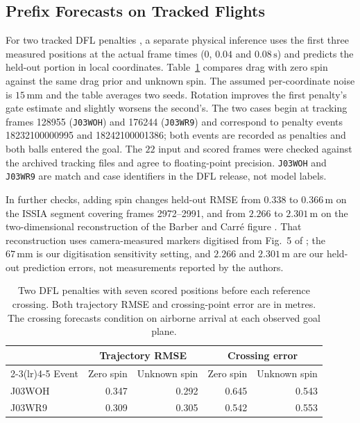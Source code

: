 \documentclass[11pt,a4paper]{article}
\begin{document}
\subsection{Prefix Forecasts on Tracked Flights}
\label{sec:dfl}

For two tracked DFL penalties \cite{dfl2025}, a separate physical inference uses the first three measured positions at the actual frame times ($0$, $0.04$ and $0.08\,\mathrm{s}$) and predicts the held-out portion in local coordinates. Table~\ref{tab:dfl} compares drag with zero spin against the same drag prior and unknown spin. The assumed per-coordinate noise is $15\,\mathrm{mm}$ and the table averages two seeds. Rotation improves the first penalty's gate estimate and slightly worsens the second's. The two cases begin at tracking frames 128955 (\texttt{J03WOH}) and 176244 (\texttt{J03WR9}) and correspond to penalty events 18232100000995 and 18242100001386; both events are recorded as penalties and both balls entered the goal. The $22$ input and scored frames were checked against the archived tracking files and agree to floating-point precision. \texttt{J03WOH} and \texttt{J03WR9} are match and case identifiers in the DFL release, not model labels.

In further checks, adding spin changes held-out RMSE from $0.338$ to $0.366\,\mathrm{m}$ on the ISSIA segment covering frames 2972--2991, and from $2.266$ to $2.301\,\mathrm{m}$ on the two-dimensional reconstruction of the Barber and Carr\'e figure \cite{barber2010}. That reconstruction uses camera-measured markers digitised from Fig.~5 of \cite{barber2010}; the $67\,\mathrm{mm}$ is our digitisation sensitivity setting, and $2.266$ and $2.301\,\mathrm{m}$ are our held-out prediction errors, not measurements reported by the authors.

\begin{table}[htbp]
  \centering
  \caption{Two DFL penalties with seven scored positions before each reference crossing. Both trajectory RMSE and crossing-point error are in metres. The crossing forecasts condition on airborne arrival at each observed goal plane.}
  \label{tab:dfl}
  \begin{tabular}{lrrrr}
    \toprule
    & \multicolumn{2}{c}{Trajectory RMSE} & \multicolumn{2}{c}{Crossing error} \\
    \cmidrule(lr){2-3}\cmidrule(lr){4-5}
    Event & Zero spin & Unknown spin & Zero spin & Unknown spin \\
    \midrule
    J03WOH & 0.347 & 0.292 & 0.645 & 0.543 \\
    J03WR9 & 0.309 & 0.305 & 0.542 & 0.553 \\
    \bottomrule
  \end{tabular}
\end{table}
\end{document}
